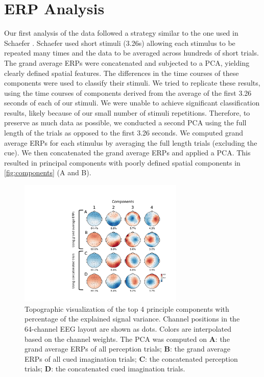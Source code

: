 \chapter{ERP Analysis}
Our first analysis of the data followed a strategy similar to the one used in Schaefer \etal \citeyear{schaefer_name_2011}.
Schaefer \etal \citeyear{schaefer_name_2011} used short stimuli (3.26s) allowing each stimulus to be repeated many times and the data to be averaged across hundreds of short trials. 
The grand average \acp{ERP} were concatenated and subjected to a \ac{PCA}, yielding clearly defined spatial features. 
The differences in the time courses of these components were used to classify their stimuli. 
We tried to replicate these results, using the time courses of components derived from the average of the first 3.26 seconds of each of our stimuli. 
We were unable to achieve significant classification results, likely because of our small number of stimuli repetitions.
Therefore, to preserve as much data as possible, we conducted a second \ac{PCA} using the full length of the trials as opposed to the first 3.26 seconds. 
We computed grand average \acp{ERP} for each stimulus by averaging the full length trials (excluding the cue).
We then concatenated the grand average \acp{ERP} and applied a \ac{PCA}. 
This resulted in principal components with poorly defined spatial components in \autoref{fig:components} (A and B).
\begin{figure}[htb]	%
  \centerline{\includegraphics[width=0.7\textwidth]{Figures/principal_components_labels.pdf}}
  \caption{Topographic visualization of the top 4 principle components with percentage of the explained signal variance. Channel positions in the 64-channel EEG layout are shown as dots. Colors are interpolated based on the channel weights. The PCA was computed on {\bf A}: the grand average \acp{ERP} of all perception trials; {\bf B}: the grand average \acp{ERP} of all cued imagination trials; {\bf C}: the concatenated perception trials; {\bf D}: the concatenated cued imagination trials.}
  \label{fig:components}
\end{figure}


